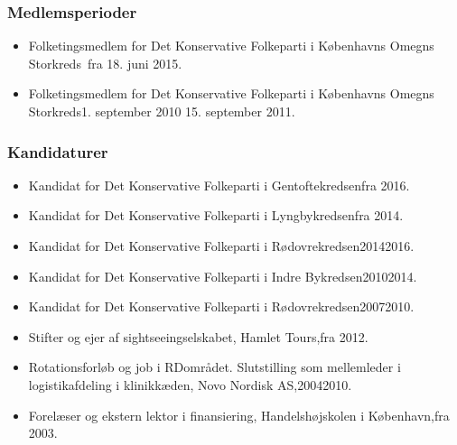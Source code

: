 \documentclass[11pt, a4paper]{awesome-cv}
\begin{document}
\begin{cvletter}
\subsubsection*{Medlemsperioder}
\begin{itemize}
\item Folketingsmedlem for Det Konservative Folkeparti i Københavns Omegns Storkreds fra 18. juni 2015.
\item Folketingsmedlem for Det Konservative Folkeparti i Københavns Omegns Storkreds1. september 2010  15. september 2011.
\end{itemize}
\subsubsection*{Kandidaturer}
\begin{itemize}
\item Kandidat for Det Konservative Folkeparti i Gentoftekredsenfra 2016.
\item Kandidat for Det Konservative Folkeparti i Lyngbykredsenfra 2014.
\item Kandidat for Det Konservative Folkeparti i Rødovrekredsen20142016.
\item Kandidat for Det Konservative Folkeparti i Indre Bykredsen20102014.
\item Kandidat for Det Konservative Folkeparti i Rødovrekredsen20072010.
\end{itemize}
\begin{itemize}
\item Stifter og ejer af sightseeingselskabet, Hamlet Tours,fra 2012.
\item Rotationsforløb og job i RDområdet. Slutstilling som mellemleder i logistikafdeling i klinikkæden, Novo Nordisk AS,20042010.
\item Forelæser og ekstern lektor i finansiering, Handelshøjskolen i København,fra 2003.
\end{itemize}
\end{cvletter}
\end{document}
